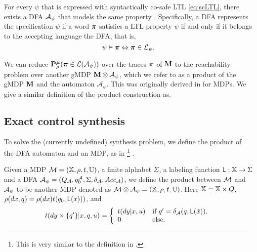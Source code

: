 \documentclass{ifacconf}
\newcommand{\red}[1]{{\color{red} #1}}
\begin{document}
For every $\psi$ that is expressed with syntactically co-safe LTL  \eqref{eq:scLTL}, there exists a DFA  $\mathcal{A}_\psi$ that models the same property \citep{Belta2017}. Specifically, a DFA represents the specification $\psi$ if a word ${\boldsymbol{\pi}}$ satisfies a LTL property $\psi$ if and only if it belongs to the accepting language the DFA, that is,
	 \[\psi\vDash{\boldsymbol{\pi}} \Leftrightarrow {\boldsymbol{\pi}}\in \mathcal{L}_\psi.\]

We can
reduce $\mathbf{P}_\rho^{\boldsymbol{\mu}}
({\boldsymbol{\pi}} \in\mathcal L(\mathcal A_\psi))$  over the traces ${\boldsymbol{\pi}}$ of ${\mathbf{M}}$ to the reachability problem
 over another gMDP   ${\mathbf{M}}\otimes\mathcal A_\psi$, which we refer to as a product of the gMDP ${\mathbf{M}}$ and the automaton $\mathcal A_\psi$. This was originally derived in \cite{tmka2013} for MDPs. We give a similar definition of the product construction as.

\subsection{Exact control synthesis}


To solve the \red{(currently undefined)} synthesis problem, we define the product of the DFA automaton and an MDP, 
as in \cite{tech_report_TACAS}\footnote{\red{This is very similar to the definition in \cite{tmka2013}. }} .
\begin{definition}
\label{def:product}
Given a MDP  $\mathcal{M} = ({\mathbb{X}}, \rho, t, {\mathbb{U}})$,
a finite alphabet $\Sigma$,
a labeling function $\mathsf{L}:{\mathbb{X}}\rightarrow\Sigma$
and a DFA  $\mathcal{A}_\psi = (Q_{\mathcal{A}}, q_0^{\mathcal{A}}, \Sigma, \delta_{\mathcal{A}}, Acc_{\mathcal{A}})$,
we define the product between $\mathcal{M}$ and $\mathcal{A}_\psi$ to be another MDP denoted as
$\mathcal{M}\otimes\mathcal{A}_\psi = (\relax {\mathbb{X}}, \relax\rho,\relax{t},{\mathbb{U}})$.
Here $\relax {\mathbb{X}}= {\mathbb{X}}\times Q$, $\relax\rho(dx,q) = \rho(dx) t(q_0,\mathsf L(x)))$, and
\begin{equation*}
  \relax{t}(d y\times\{q'\}|x,q,u) =  \left\{\begin{array}{ll}t(dy|x,u)& \text{if } q' =\delta_{\mathcal{A}}(q,\mathsf{L}(\tilde x)),\\ 0 & \text{else.}  \end{array}\right.
\end{equation*} 
\end{definition}

 
\end{document}
